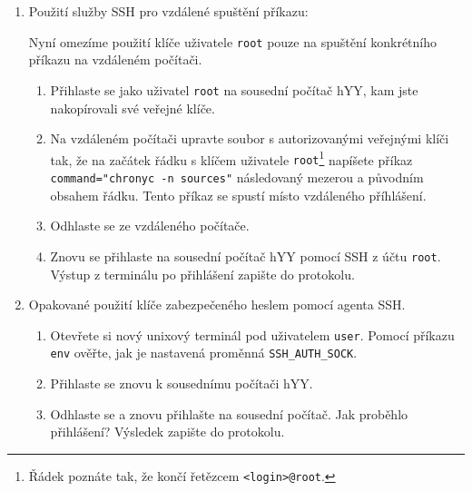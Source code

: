 \documentclass[a4paper,11pt]{article}
\begin{document}
\begin{enumerate}
  \item Použití služby SSH pro vzdálené spuštění příkazu:
    
    Nyní omezíme použití klíče uživatele {\tt root} pouze na spuštění konkrétního příkazu na vzdáleném počítači.
    \begin{enumerate}
    \item Přihlaste se jako uživatel {\tt root} na sousední počítač hYY, kam jste nakopírovali své veřejné klíče.
    \item Na vzdáleném počítači upravte soubor s autorizovanými veřejnými klíči tak, že na začátek řádku s klíčem uživatele {\tt root}\footnote{Řádek poznáte tak, že končí řetězcem {\tt <login>@root}.} napíšete příkaz 
        \verb|command="chronyc -n sources"| následova\-ný mezerou a původním obsahem řádku. Tento příkaz se spustí místo vzdáleného příhlášení. 
      \item Odhlaste se ze vzdáleného počítače.
      \item Znovu se přihlaste na sousední počítač hYY pomocí SSH z účtu {\tt root}. Výstup z terminálu po přihlášení zapište do protokolu.
    \end{enumerate}
  \item Opakované použití klíče zabezpečeného heslem pomocí agenta SSH.
    \begin{enumerate}
      \item Otevřete si nový unixový terminál pod uživatelem {\tt user}. Pomocí příkazu \verb|env| ověřte, jak je nastavená proměnná \verb|SSH_AUTH_SOCK|.
      \item Přihlaste se znovu k sousednímu počítači hYY.
      \item Odhlaste se a znovu přihlašte na sousední počítač. Jak proběhlo přihlášení? Výsledek zapište do protokolu.
    \end{enumerate}
\end{enumerate}
\end{document}

